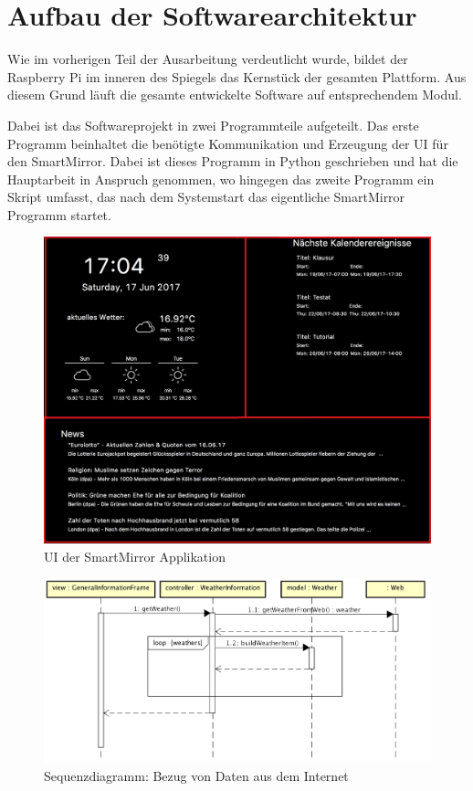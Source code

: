 \section{Aufbau der Softwarearchitektur}
Wie im vorherigen Teil der Ausarbeitung verdeutlicht wurde, bildet der Raspberry Pi im inneren des Spiegels das Kernstück der gesamten Plattform. Aus diesem Grund läuft die gesamte entwickelte Software auf entsprechendem Modul. 

Dabei ist das Softwareprojekt in zwei Programmteile aufgeteilt. Das erste Programm beinhaltet die benötigte Kommunikation und Erzeugung der UI für den SmartMirror. Dabei ist dieses Programm in Python geschrieben und hat die Hauptarbeit in Anspruch genommen, wo hingegen das zweite Programm ein Skript umfasst, das nach dem Systemstart das eigentliche SmartMirror Programm startet. 

\begin{figure}
	\centering
	\includegraphics[width=0.7\linewidth]{bilder/grafOberflaeche}
	\caption[UI der SmartMirror Applikation]{UI der SmartMirror Applikation}
	\label{fig:grafoberflaeche}
\end{figure}

\begin{figure}
	\centering
	\includegraphics[width=0.7\linewidth]{bilder/sequenceDiagramGettingDataNoBackground}
	\caption{Sequenzdiagramm: Bezug von Daten aus dem Internet}
	\label{fig:sequenzDiagramData}
\end{figure}

